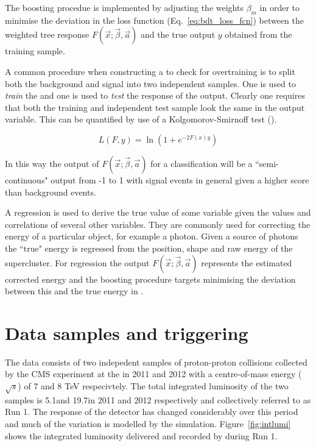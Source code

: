 The boosting procedue is implemented by adjusting the weights $\beta_{m}$ in order to minimise the deviation in the loss function (Eq.~\ref{eq:bdt_loss_fcn}) between the weighted tree response $F(\vec{x};\vec{\beta},\vec{a})$ and the true output $y$ obtained from the training sample. 

A common procedure when constructing a \BDT to check for overtraining is to split both the background and signal into two independent samples. One is used to \emph{train} the \BDT and one is used to \emph{test} the response of the output. Clearly one requires that both the training and independent test sample look the same in the output variable. This can be quantified by use of a Kolgomorov-Smirnoff test (). 

\begin{equation}
  L(F,y) = \ln(1+e^{-2F(x)y})
  \label{eq:bdt_loss_fcn}
\end{equation}

In this way the output of $F(\vec{x};\vec{\beta},\vec{a})$ for a classification \BDT will be a ``semi-continuous" output from -1 to 1 with signal events in general given a higher score than background events.

A regression \BDT is used to derive the true value of some variable given the values and correlations of several other variables. They are commonly used for correcting the energy of a particular object, for example a photon. Given a \MC source of photons the ``true" energy is regressed from the position, shape and raw energy of the supercluster. For regression \BDTs the output $F(\vec{x};\vec{\beta},\vec{a})$ represents the estimated corrected energy and the boosting procedure targets minimising the deviation between this and the true energy in \MC. 

\section{Data samples and triggering}

The data consists of two indepedent samples of proton-proton collisions collected by the CMS experiment at the \LHC in 2011 and 2012 with a centre-of-mass energy ($\sqrt{s}$) of 7 and 8 TeV respecivtely. The total integrated luminosity of the two samples is 5.1\fb and 19.7\fb in 2011 and 2012 respectively and collectively referred to as \LHC Run 1. The response of the detector has changed considerably over this period and much of the variation is modelled by the \MC simulation. Figure~\ref{fig:intlumi} shows the integrated luminosity delivered and recorded by \CMS during \LHC Run 1.

